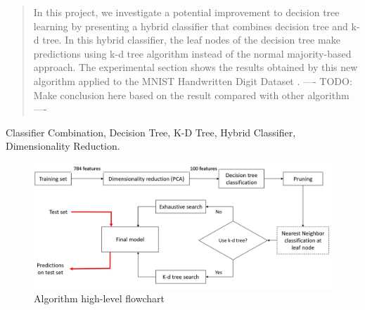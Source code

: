 \documentclass[conference]{IEEEtran}
\begin{document}
	\begin{abstract}
		In this project, we investigate a potential improvement to decision tree learning by presenting a hybrid classifier that combines decision tree and k-d tree. In this hybrid classifier, the leaf nodes of the decision tree make predictions using k-d tree algorithm instead of the normal majority-based approach. The experimental section shows the results obtained by this new algorithm applied to the MNIST Handwritten Digit Dataset \cite{MNISTDatabase}. ---- TODO: Make conclusion here based on the result compared with other algorithm ----
	\end{abstract}

	\begin{IEEEkeywords}
		Classifier Combination, Decision Tree, K-D Tree, Hybrid Classifier, Dimensionality Reduction.
	\end{IEEEkeywords}


	\IEEEpeerreviewmaketitle

\begin{figure}[thbp]
	\includegraphics[width=\textwidth]{Figures/workflow.jpg}
	\caption{Algorithm high-level flowchart}
	\label{fig:workflow}
\end{figure}
\end{document}
